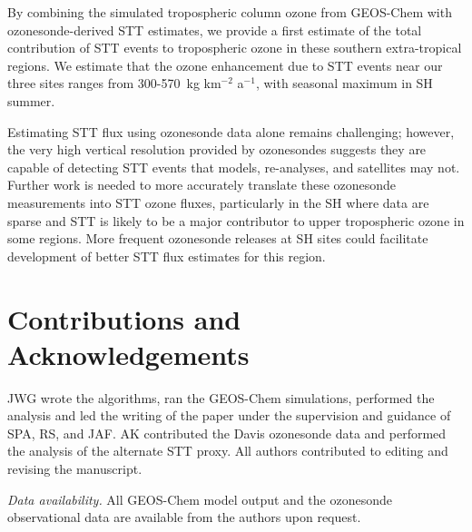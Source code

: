   By combining the simulated tropospheric column ozone from GEOS-Chem with ozonesonde-derived STT estimates, we provide a first estimate of the total contribution of STT events to tropospheric ozone in these southern extra-tropical regions.
  We estimate that the ozone enhancement due to STT events near our three sites ranges from 300-570~kg km$^{-2}$ a$^{-1}$, with seasonal maximum in SH summer.
  
  Estimating STT flux using ozonesonde data alone remains challenging; however, the very high vertical resolution provided by ozonesondes suggests  they are capable of detecting STT events that models, re-analyses, and satellites may not. 
  Further work is needed to more accurately translate these ozonesonde measurements into STT ozone fluxes, particularly in the SH where data are sparse and STT is likely to be a major contributor to upper tropospheric ozone in some regions.
  More frequent ozonesonde releases at SH sites could facilitate development of better STT flux estimates for this region.

\section{Contributions and Acknowledgements}
  \label{Ozone:contributions}
  JWG wrote the algorithms, ran the GEOS-Chem simulations, performed the analysis and led the writing of the paper under the supervision and guidance of SPA, RS, and JAF. 
  AK contributed the Davis ozonesonde data and performed the analysis of the alternate STT proxy. 
  All authors contributed to editing and revising the manuscript.

  
  
  \textit{Data availability.} All GEOS-Chem model output and the ozonesonde observational data are available from the authors upon request.

